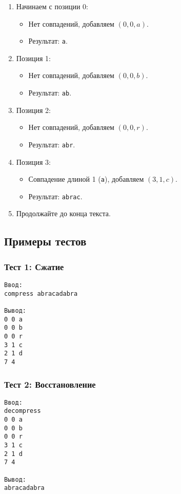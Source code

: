 \begin{enumerate}
  \item Начинаем с позиции 0:
    \begin{itemize}
      \item Нет совпадений, добавляем $(0, 0, a)$.
      \item Результат: \texttt{a}.
    \end{itemize}

  \item Позиция 1:
    \begin{itemize}
      \item Нет совпадений, добавляем $(0, 0, b)$.
      \item Результат: \texttt{ab}.
    \end{itemize}

  \item Позиция 2:
    \begin{itemize}
      \item Нет совпадений, добавляем $(0, 0, r)$.
      \item Результат: \texttt{abr}.
    \end{itemize}

  \item Позиция 3:
    \begin{itemize}
      \item Совпадение длиной 1 (\texttt{a}), добавляем $(3, 1, c)$.
      \item Результат: \texttt{abrac}.
    \end{itemize}

  \item Продолжайте до конца текста.
\end{enumerate}

\subsection*{Примеры тестов}

\subsubsection*{Тест 1: Сжатие}

\begin{verbatim}
Ввод:
compress abracadabra

Вывод:
0 0 a
0 0 b
0 0 r
3 1 c
2 1 d
7 4
\end{verbatim}

\subsubsection*{Тест 2: Восстановление}

\begin{verbatim}
Ввод:
decompress
0 0 a
0 0 b
0 0 r
3 1 c
2 1 d
7 4

Вывод:
abracadabra
\end{verbatim}


